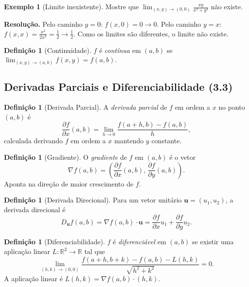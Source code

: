 \documentclass[12pt,a4paper]{article}
\theoremstyle{definition}
\newtheorem{definition}[theorem]{Definição}
\newtheorem{example}[theorem]{Exemplo}
\theoremstyle{remark}
\begin{document}
\begin{example}[Limite inexistente]
  Mostre que $\displaystyle\lim_{(x,y)\to(0,0)}\frac{xy}{x^2+y^2}$ não existe.

  \textbf{Resolução.}
  Pelo caminho $y=0$: $f(x,0)=0\to 0$.
  Pelo caminho $y=x$: $f(x,x)=\frac{x^2}{2x^2}=\frac{1}{2}\to\frac{1}{2}$.
  Como os limites são diferentes, o limite não existe.
\end{example}

\begin{definition}[Continuidade]
  $f$ é \emph{contínua} em $(a,b)$ se
  $\displaystyle\lim_{(x,y)\to(a,b)}f(x,y)=f(a,b)$.
\end{definition}

\subsection{Derivadas Parciais e Diferenciabilidade (3.3)}

\begin{definition}[Derivada Parcial]
  A \emph{derivada parcial} de $f$ em ordem a $x$ no ponto $(a,b)$ é
  \[
    \frac{\partial f}{\partial x}(a,b)
    = \lim_{h\to 0}\frac{f(a+h,b)-f(a,b)}{h},
  \]
  calculada derivando $f$ em ordem a $x$ mantendo $y$ constante.
\end{definition}

\begin{definition}[Gradiente]
  O \emph{gradiente} de $f$ em $(a,b)$ é o vetor
  \[
    \nabla f(a,b) = \left(\frac{\partial f}{\partial x}(a,b),\,
                          \frac{\partial f}{\partial y}(a,b)\right).
  \]
  Aponta na direção de maior crescimento de $f$.
\end{definition}

\begin{definition}[Derivada Direcional]
  Para um vetor unitário $\mathbf{u}=(u_1,u_2)$, a derivada direcional é
  \[
    D_{\mathbf{u}}f(a,b) = \nabla f(a,b)\cdot\mathbf{u}
      = \frac{\partial f}{\partial x}u_1 + \frac{\partial f}{\partial y}u_2.
  \]
\end{definition}

\begin{definition}[Diferenciabilidade]
  $f$ é \emph{diferenciável} em $(a,b)$ se existir uma aplicação linear
  $L:\mathbb{R}^2\to\mathbb{R}$ tal que
  \[
    \lim_{(h,k)\to(0,0)}\frac{f(a+h,b+k)-f(a,b)-L(h,k)}{\sqrt{h^2+k^2}}=0.
  \]
  A aplicação linear é $L(h,k)=\nabla f(a,b)\cdot(h,k)$.
\end{definition}
\end{document}
